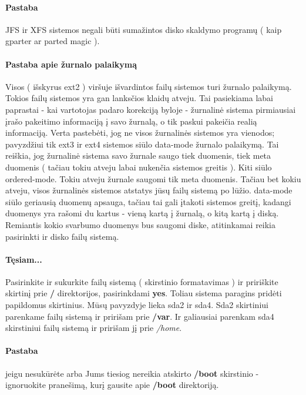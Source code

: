\paragraph{Pastaba} JFS ir XFS sistemos negali būti sumažintos disko
skaldymo programų ( kaip gparter ar parted magic ).

\paragraph{Pastaba apie žurnalo palaikymą}

Visos ( išskyrus ext2 ) viršuje išvardintos failų sistemos turi
žurnalo palaikymą. Tokios failų sistemos yra gan
lanksčios klaidų atveju. Tai pasiekiama labai paprastai - kai
vartotojas padaro korekciją byloje - žurnalinė sistema pirmiausiai
įrašo pakeitimo informaciją į savo žurnalą, o tik paskui pakeičia
realią informaciją. Verta pastebėti, jog ne visos žurnalinės sistemos
yra vienodos; pavyzdžiui tik ext3 ir ext4 sistemos siūlo data-mode
žurnalo palaikymą. Tai reiškia, jog žurnalinė sistema savo žurnale
saugo tiek duomenis, tiek meta duomenis ( tačiau tokiu atveju labai
nukenčia sistemos greitis ). Kiti siūlo ordered-mode. Tokiu atveju
žurnale saugomi tik meta duomenis. Tačiau bet kokiu atveju, visos
žurnalinės sistemos atstatys jūsų failų sistemą po lūžio. data-mode
siūlo geriausią duomenų apsauga, tačiau tai gali įtakoti sistemos
greitį, kadangi duomenys yra rašomi du kartus - vieną kartą į žurnalą,
o kitą kartą į diską. Remiantis kokio svarbumo duomenys bus saugomi
diske, atitinkamai reikia pasirinkti ir disko failų sistemą.

\paragraph{Tęsiam...}

Pasirinkite ir sukurkite failų sistemą ( skirstinio formatavimas ) ir
pririškite skirtinį prie \textbf{/} direktorijos, pasirinkdami
\textbf{yes}. Toliau sistema paragins pridėti papildomus
skirtinius. Mūsų pavyzdyje lieka sda2 ir sda4. Sda2 skirtiniui
parenkame failų sistemą ir pririšam prie \textbf{/var}. Ir galiausiai
parenkam sda4 skirstiniui failų sistemą ir pririšam jį prie
\textsl{/home}.

\paragraph{Pastaba} jeigu nesukūrėte arba Jums tiesiog nereikia
atskirto \textbf{/boot} skirstinio - ignoruokite pranešimą, kurį
gausite apie \textbf{/boot} direktoriją.

